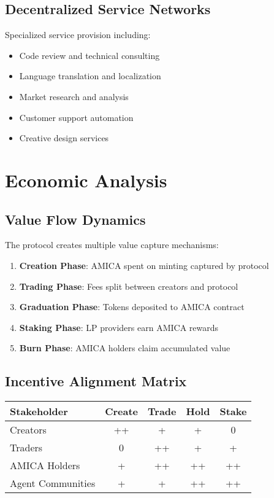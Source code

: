 \documentclass{article}
\begin{document}
\subsection{Decentralized Service Networks}

Specialized service provision including:
\begin{itemize}
    \item Code review and technical consulting
    \item Language translation and localization
    \item Market research and analysis
    \item Customer support automation
    \item Creative design services
\end{itemize}

\section{Economic Analysis}

\subsection{Value Flow Dynamics}

The protocol creates multiple value capture mechanisms:

\begin{enumerate}
    \item \textbf{Creation Phase}: AMICA spent on minting captured by protocol
    \item \textbf{Trading Phase}: Fees split between creators and protocol
    \item \textbf{Graduation Phase}: Tokens deposited to AMICA contract
    \item \textbf{Staking Phase}: LP providers earn AMICA rewards
    \item \textbf{Burn Phase}: AMICA holders claim accumulated value
\end{enumerate}

\subsection{Incentive Alignment Matrix}

\begin{center}
\begin{tabular}{|l|c|c|c|c|}
\hline
\textbf{Stakeholder} & \textbf{Create} & \textbf{Trade} & \textbf{Hold} & \textbf{Stake} \\
\hline
Creators & ++ & + & + & 0 \\
Traders & 0 & ++ & + & + \\
AMICA Holders & + & ++ & ++ & ++ \\
Agent Communities & + & + & ++ & ++ \\
\hline
\end{tabular}
\end{center}
\end{document}

